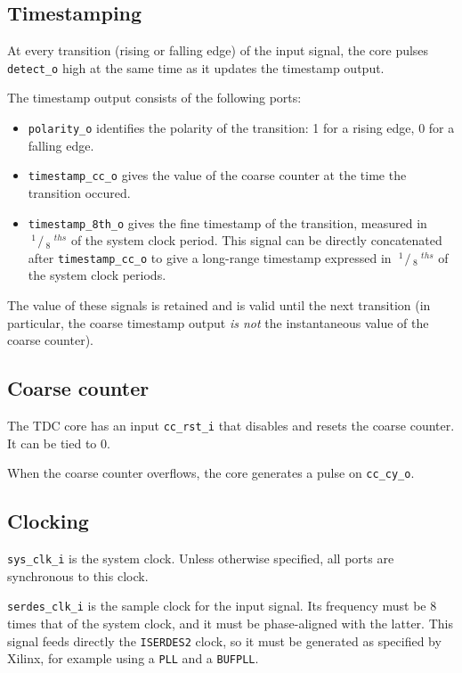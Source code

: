 \documentclass[a4paper,11pt]{article}
\def\slantfrac#1#2{ \hspace{3pt}\!^{#1}\!\!\hspace{1pt}/ \hspace{2pt}\!\!_{#2}\!\hspace{3pt} }
\begin{document}
\subsection{Timestamping}
At every transition (rising or falling edge) of the input signal, the core pulses \verb!detect_o! high at the same time as it updates the timestamp output.

The timestamp output consists of the following ports:
\begin{itemize}
\item \verb!polarity_o! identifies the polarity of the transition: 1 for a rising edge, 0 for a falling edge.
\item \verb!timestamp_cc_o! gives the value of the coarse counter at the time the transition occured.
\item \verb!timestamp_8th_o! gives the fine timestamp of the transition, measured in $\slantfrac{1}{8}^{ths}$ of the system clock period. This signal can be directly concatenated after \verb!timestamp_cc_o! to give a long-range timestamp expressed in $\slantfrac{1}{8}^{ths}$ of the system clock periods.
\end{itemize}

The value of these signals is retained and is valid until the next transition (in particular, the coarse timestamp output \textit{is not} the instantaneous value of the coarse counter).

\subsection{Coarse counter}
The TDC core has an input \verb!cc_rst_i! that disables and resets the coarse counter. It can be tied to 0.

When the coarse counter overflows, the core generates a pulse on \verb!cc_cy_o!.

\subsection{Clocking}
\verb!sys_clk_i! is the system clock. Unless otherwise specified, all ports are synchronous to this clock.

\verb!serdes_clk_i! is the sample clock for the input signal. Its frequency must be 8 times that of the system clock, and it must be phase-aligned with the latter. This signal feeds directly the \verb!ISERDES2! clock, so it must be generated as specified by Xilinx, for example using a \verb!PLL! and a \verb!BUFPLL!.
\end{document}
